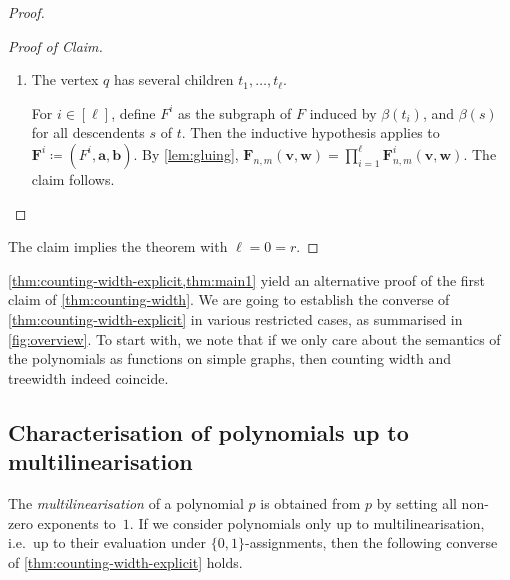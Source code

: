 \documentclass[10pt,a4paper]{article}
\theoremstyle{definition}
\theoremstyle{plain}
\theoremstyle{remark}
\newenvironment{claimproof}[1][Proof of Claim]{\begin{proof}[#1] \renewcommand{\qedsymbol}{$\lrcorner$}}{ \end{proof}}
\begin{document}
\begin{proof}
\begin{claimproof}
\begin{enumerate}
				\item The vertex $q$ has several children $t_1, \dots, t_\ell$.
				
				For $i \in [\ell]$,
				define $F^i$ as the subgraph of $F$ induced by $\beta(t_i)$, and $\beta(s)$ for all descendents $s$ of $t$.
				Then the inductive hypothesis applies to $\boldsymbol{F}^i \coloneqq (F^i, \boldsymbol{a}, \boldsymbol{b})$.
				By \cref{lem:gluing}, $\boldsymbol{F}_{n,m}(\boldsymbol{v}, \boldsymbol{w}) = \prod_{i=1}^\ell \boldsymbol{F}^i_{n,m}(\boldsymbol{v}, \boldsymbol{w})$.
				The claim follows.\qedhere
			\end{enumerate}
		\end{claimproof}
		The claim implies the theorem with $\ell = 0 = r$.	
	\end{proof}
	
	\cref{thm:counting-width-explicit,thm:main1} yield an alternative proof of the first claim of \cref{thm:counting-width}.
We are going to establish the converse of \cref{thm:counting-width-explicit} in various restricted cases, as summarised in \cref{fig:overview}. To start with, we note that if we only care about the semantics of the polynomials as functions on simple graphs, then counting width and treewidth indeed coincide.
 	
	
	\subsection{Characterisation of polynomials up to multilinearisation}
	The \emph{multilinearisation} of a polynomial $p$ is obtained from $p$ by setting all non-zero exponents to~$1$. 
	If we consider polynomials only up to multilinearisation, i.e.\ up to their evaluation under $\{0,1\}$-assignments, then
	the following converse of \cref{thm:counting-width-explicit} holds.	
	\multilinear*
\end{document}
